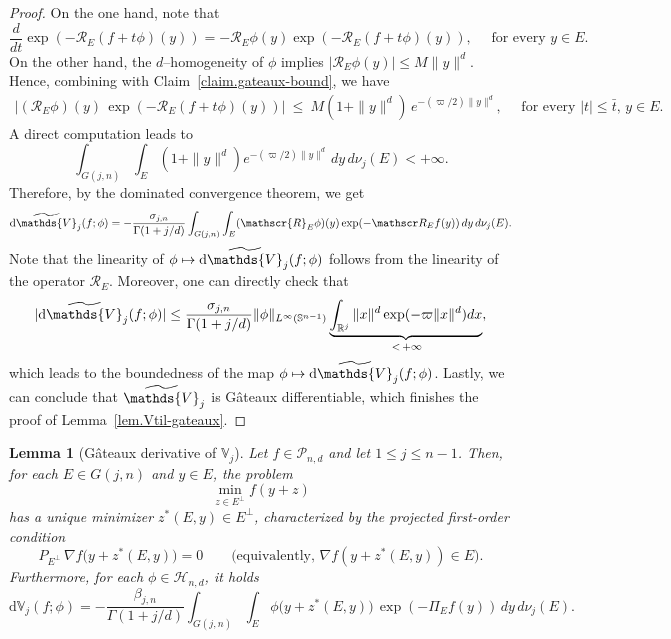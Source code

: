 \documentclass[11pt]{article}
\newtheorem{lemma}[theorem]{Lemma}
\theoremstyle{definition}
\numberwithin{equation}{section}
\newcommand{\R}{\mathbb{R}}
\newcommand{\Sph}{\mathbb{S}}        %
\newcommand{\cH}{\mathcal{H}}        %
\newcommand{\cP}{\mathcal{P}}        %
\newcommand{\opV}{\mathds{V}}       %
\begin{document}
\begin{proof}
On the one hand, note that
\[
	\dfrac{d}{dt} \exp(- \mathscr R_E(f + t \phi)(y)) = - \mathscr R_E \phi(y) \exp( - \mathscr R_E(f + t \phi)(y)), \quad \text{ for every } y \in  E.
\]
On the other hand, the $d$--homogeneity of $\phi$ implies $| \mathscr R_E \phi(y) | \leq M \| y \|^d$.
Hence, combining with Claim~\ref{claim.gateaux-bound}, we have
\begin{align*}
	\left\vert (\mathscr R_E\phi)(y)\,\exp(-\mathscr R_E (f + t \phi)(y)) \right\vert
\ \le\ M(1+\|y\|^d)\,e^{-(\varpi/2)\|y\|^d}, \quad \text{ for every } |t| \leq \bar t, \, y \in E.
\end{align*}
A direct computation leads to
\[
    \int_{G(j, n)} \int_E (1 + \| y \|^d) e^{-(\varpi/2)\|y\|^d} \, dy \, d\nu_j(E) < + \infty.
\]
Therefore, by the dominated convergence theorem, we get
\begin{align*}
       \mathrm d \widetilde\opV_j(f; \phi) = - \dfrac{\sigma_{j, n}}{\Gamma(1 + j/d)} \int_{G(j, n)}\int_E (\mathscr{R}_E \phi)(y) \exp(- \mathscr R_E f(y)) \, dy \, d\nu_j(E).
\end{align*}
Note that the linearity of $\phi \mapsto \mathrm d \widetilde\opV_j(f; \phi)$ follows from the linearity of the operator $\mathscr R_E$.
Moreover, one can directly check that
\begin{align*}
	|  \mathrm d \widetilde\opV_j(f; \phi)| \leq \dfrac{\sigma_{j, n}}{\Gamma(1 + j/d)}\| \phi \|_{L^\infty(\Sph^{n - 1})} \underbrace{\int_{\R^j} \| x \|^d \exp(- \varpi \| x \|^d) dx}_{\,  < \, + \infty},
\end{align*}
which leads to the boundedness of the map $\phi \mapsto \mathrm d \widetilde\opV_j(f; \phi)$.
Lastly, we can conclude that $\widetilde\opV_j$ is G\^ateaux differentiable, which finishes the proof of Lemma~\ref{lem.Vtil-gateaux}.
\end{proof}

\begin{lemma}[G\^ateaux derivative of $\opV_j$]\label{lem.V-gateaux}
Let $f\in\cP_{n,d}$ and let $1 \leq j \leq n - 1$.
Then, for each $E\in G(j,n)$ and $y\in E$, the problem
\begin{equation}\label{min.E^perp}
\min_{z\in E^\perp} f(y+z)
\end{equation}
has a unique minimizer $z^\ast(E,y) \in E^\perp$, characterized by the projected first-order condition
\begin{equation}\label{eq:proj-FOC}
P_{E^\perp}\,\nabla f\big(y+z^\ast(E,y)\big)=0
\qquad\text{(equivalently, $\nabla f(y+z^\ast(E,y))\in E$).}
\end{equation} 
Furthermore, for each $\phi \in \cH_{n, d}$, it holds
\[
\mathrm{d} \opV_j(f; \phi)
= -\frac{\beta_{j,n}}{\Gamma(1+j/d)}\int_{G(j,n)}\!\int_E \phi\big(y+z^\ast(E,y)\big)\, \exp(-\Pi_E f(y))\,dy\,d\nu_j(E).
\]
\end{lemma}
\end{document}
